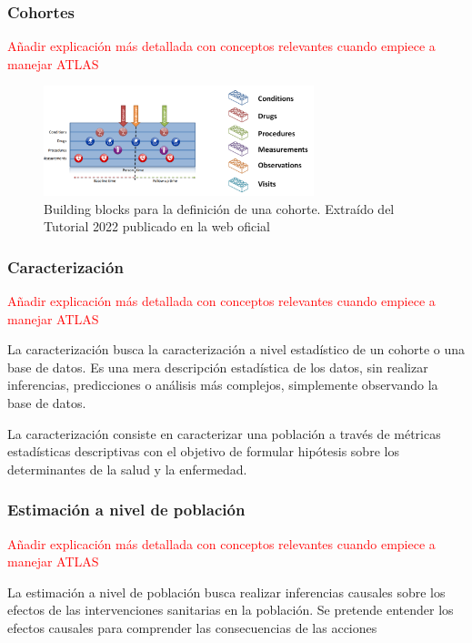 \subsubsection{Cohortes}

\textcolor{red}{Añadir explicación más detallada con conceptos relevantes cuando empiece a manejar ATLAS}

\begin{figure}[H]
\centering
\includegraphics[width=0.70\textwidth]{figures/bblocksPatientJourney.png}
     \caption{Building blocks para la definición de una cohorte. Extraído del Tutorial 2022 publicado en la web oficial \cite{OHDSIwebsite}}
    \label{fig:bblocksPatientJourney}
\end{figure}


\subsubsection{Caracterización}

\textcolor{red}{Añadir explicación más detallada con conceptos relevantes cuando empiece a manejar ATLAS}

La caracterización busca la caracterización a nivel estadístico de un cohorte o una base de datos. Es una mera descripción estadística de los datos, sin realizar inferencias, predicciones o análisis más complejos, simplemente observando la base de datos.

La caracterización consiste en caracterizar una población a través de métricas estadísticas descriptivas con el objetivo de formular hipótesis sobre los determinantes de la salud y la enfermedad.

\subsubsection{Estimación a nivel de población}

\textcolor{red}{Añadir explicación más detallada con conceptos relevantes cuando empiece a manejar ATLAS}

La estimación a nivel de población busca realizar inferencias causales sobre los efectos de las intervenciones sanitarias en la población. Se pretende entender los efectos causales para comprender las consecuencias de las acciones

